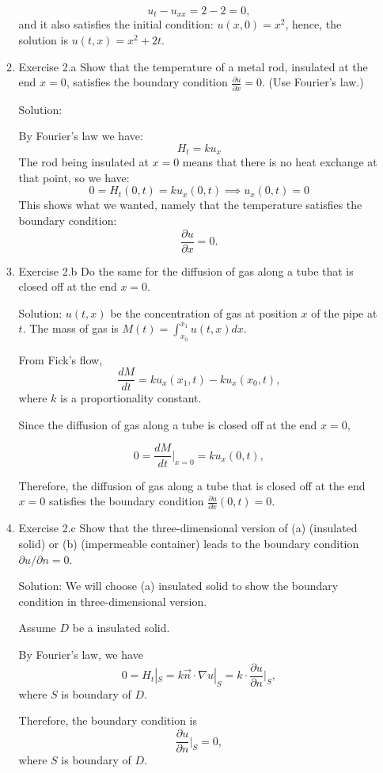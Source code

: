 \documentclass{article}
\begin{document}
\begin{enumerate}
\begin{enumerate}
		\[u_{t}-u_{xx}=2-2=0,\] and it also satisfies the initial condition: $u(x,0)=x^2$, hence, the solution is $u(t,x)=x^2+2t$.

		\item Exercise 2.a Show that the temperature of a metal rod,
			insulated at the end $x=0$, satisfies the boundary
			condition $\frac{\partial u}{\partial x} =0$. (Use
			Fourier's law.)

			Solution:

			By Fourier's law we have:
			\[
				H_t = ku_x
			\]
			The rod being insulated at $x=0$ means that there is no
			heat exchange at that point, so we have:
			\[
				0 = H_t(0,t) = ku_x(0,t) \implies u_x(0,t) =0
			\]
			This shows what we wanted, namely that the temperature
			satisfies the boundary condition:
			\[
				\frac{\partial u}{\partial x} =0.
			\]
		\item Exercise 2.b Do the same for the diffusion of gas along a tube that is closed off at the end $x=0$.
		
		Solution: $u(t,x)$ be the concentration of gas at position $x$ of the pipe at $t$.
        The mass of gas is $M(t)= \int_{x_0}^{x_1} u(t,x)dx$.
		
		From Fick's flow, 
        \[ \frac{dM}{dt}=ku_{x}(x_{1},t)- ku_{x}(x_{0},t),\]
		where $k$ is a proportionality constant.

		Since the diffusion of gas along a tube is closed off at the end $x=0$,

       \[0= \frac{dM}{dt}|_ {x=0}= ku_{x}(0,t),\]

	   Therefore, the diffusion of gas along a tube that is closed off at the end $x=0$ satisfies the boundary condition $ \frac{\partial u}{\partial x}(0,t)=0.$

		\item Exercise 2.c  Show that the three-dimensional version of (a) (insulated solid) or (b) (impermeable container) leads to the boundary condition $\partial u/ \partial n=0$.
		
		Solution: We will choose (a) insulated solid to show the boundary condition in three-dimensional version.
	    
		Assume $D$ be a insulated solid.
		 
		By Fourier's law, we have 
		 \[0= H_{t}|_{S}= k\vec{n}\cdot \nabla u |_{S}=k\cdot \frac{\partial u}{\partial n}|_{S}, \]
        where $S$ is boundary of $D$.

		Therefore, the boundary condition is \[ \frac{\partial u}{\partial n}|_{S}=0,\]
		where $S$ is boundary of $D$.


\end{enumerate}
\end{enumerate}
\end{document}
